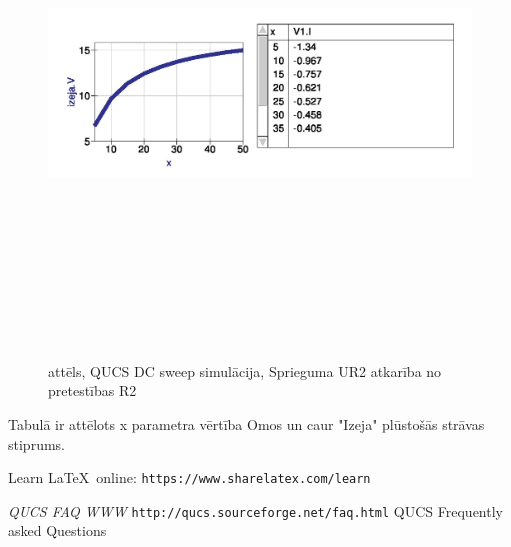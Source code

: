 \documentclass[a4paper,10pt]{report}
\begin{document}
\begin{figure}[H]
\includegraphics[width=14cm,height=14cm,keepaspectratio]{qucsSimulacija.jpg}
\caption{attēls, QUCS DC sweep simulācija, Sprieguma UR2 atkarība no pretestības R2}
\end{figure}
Tabulā ir attēlots x parametra vērtība Omos un caur "Izeja" plūstošās strāvas stiprums.

\begin{thebibliography}{2}
Learn \LaTeX\ online:
\texttt{https://www.sharelatex.com/learn}

\textit{QUCS FAQ WWW}
\texttt{http://qucs.sourceforge.net/faq.html} 
QUCS Frequently asked Questions
\end{thebibliography}
\end{document}
